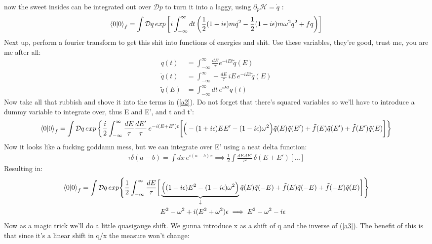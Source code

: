 \documentclass[10pt]{article}
\begin{document}
now the sweet insides can be integrated out over $\mathcal{D}p$ to turn it into a laggy, using $\partial_{p}\mathcal{H} = \dot{q}$ :
\begin{align}
	\braket{0}{0}_f=\int \mathcal{D}q \,exp \left[ i \int_{-\infty}^{\infty}dt \left( \frac{1}{2}(1+i\epsilon)m\dot{q}^2 - \frac{1}{2}(1-i\epsilon)m\omega^2q^2 + fq \right) \right] \label{a2}
\end{align}
Next up, perform a fourier transform to get this shit into functions of energies and shit. Use these variables, they're good, trust me, you are me after all:
\begin{align}
	q(t)&=\int_{-\infty}^{\infty} \frac{dE}{\tau} e^{-iEt} \tilde{q}(E) \\[1.5Ex]
	\dot{q}(t)&=\int_{-\infty}^{\infty} -\frac{dE}{\tau}\,iE\,e^{-iEt} \tilde{q}(E) \\[1.5Ex]
\tilde{q}(E)&=\int_{-\infty}^{\infty}dt\,e^{iEt}q(t)
\end{align}
Now take all that rubbish and shove it into the terms in (\ref{a2}). Do not forget that there's squared variables so we'll have to introduce a dummy variable to integrate over, thus E and E', and t and t':
\begin{align}
	\braket{0}{0}_f = \int \mathcal{D}q\, exp \left\{ \frac{i}{2} \int_{-\infty}^{\infty} \frac{dE}{\tau} \frac{dE'}{\tau}\, e^{-i(E+E')t} \bigg[ \Big( -(1+i\epsilon)EE' - (1-i\epsilon)\omega^2 \Big) \tilde{q}(E) \tilde{q}(E') + \tilde{f}(E) \tilde{q}(E') + \tilde{f}(E') \tilde{q}(E) \bigg] \right\}
\end{align}
Now it looks like a fucking goddamn mess, but we can integrate over E' using a neat delta function:
\begin{align}
	\tau \delta(a-b)= \int dx\,e^{i(a-b)x} \implies \frac{1}{2} \int \frac{dE\,dE'}{\tau^2} \,\delta(E+E') [ \ldots ] \label{delta}
\end{align}
Resulting in:
\begin{align}
	\braket{0}{0}_f = \int \mathcal{D}q\, exp \Bigg\{ \frac{1}{2} \int_{-\infty}^{\infty} \frac{dE}{\tau} \bigg[ &\underbrace{ \Big( (1+i\epsilon)E^2 - (1-i\epsilon)\omega^2 \Big) }_{\downarrow} \tilde{q}(E) \tilde{q}(-E) + \tilde{f}(E) \tilde{q}(-E) + \tilde{f}(-E) \tilde{q}(E) \bigg]  \Bigg\} \label{a4} \\
														     &E^2 - \omega^2 + i(E^2 + \omega^2)\epsilon \implies E^2 - \omega^2 - i\epsilon \label{a3}
\end{align}
Now as a magic trick we'll do a little quasigauge shift. We gunna introduce x as a shift of q and the inverse of (\ref{a3}). The benefit of this is that since it's a linear shift in q/x the measure won't change:
\end{document}
